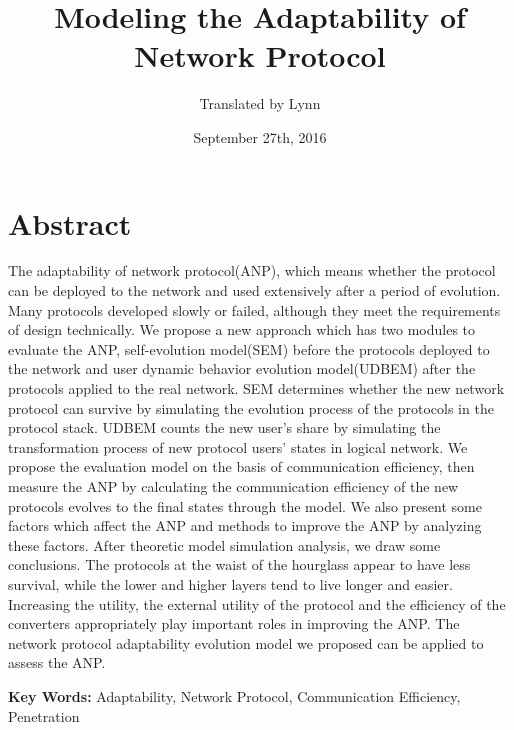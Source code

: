\documentclass{article}
\title{Modeling the Adaptability of Network Protocol}
\author{Translated by Lynn }
\date{September 27th, 2016}
\begin{document}
\maketitle

\section*{Abstract}
The adaptability of network protocol(ANP), which means whether the protocol can be deployed to the network
and used extensively after a period of evolution. Many protocols developed slowly or failed, although they
meet the requirements of design technically. We propose a new approach which has two modules to evaluate
the ANP, self-evolution model(SEM) before the protocols deployed to the network and user dynamic behavior
evolution model(UDBEM) after the protocols applied to the real network. SEM determines whether the new
network protocol can survive by simulating the evolution process of the protocols in the protocol stack.
UDBEM counts the new user's share by simulating the transformation process of new protocol users' states
in logical network. We propose the evaluation model on the basis of communication efficiency, then measure
the ANP by calculating the communication efficiency of the new protocols evolves to the final states through
the model. We also present some factors which affect the ANP and methods to improve the ANP by analyzing
these factors. After theoretic model simulation analysis, we draw some conclusions. The protocols at the
waist of the hourglass appear to have less survival, while the lower and higher layers tend to live longer
and easier. Increasing the utility, the external utility of the protocol and the efficiency of the converters
appropriately play important roles in improving the ANP. The network protocol adaptability evolution model
we proposed can be applied to assess the ANP.

\setlength{\parskip}{0.5\baselineskip}
\par\noindent \textbf {Key Words:}
Adaptability, Network Protocol, Communication Efficiency, Penetration
\end{document}
